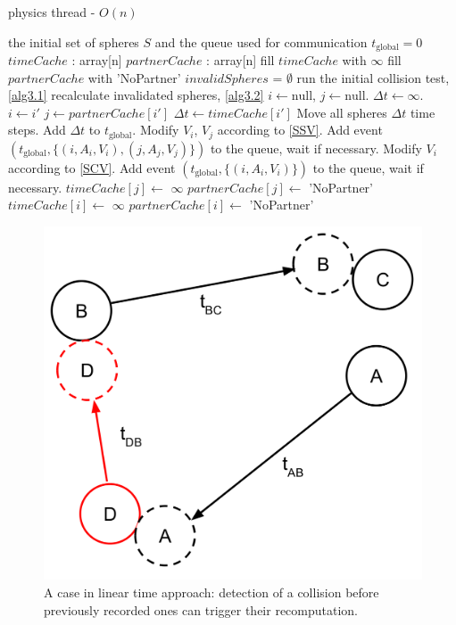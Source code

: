 \documentclass[journal, letterpaper]{IEEEtran}
\begin{document}
\begin{algorithm}
\caption{physics thread - $O(n)$}
\label{alg3}
\begin{algorithmic}
	\REQUIRE the initial set of spheres $S$ and the queue used for communication
	\STATE $t_\text{global}=0$ 
	\STATE $timeCache$ : array[n]
	\STATE $partnerCache$ : array[n]
	\STATE fill $timeCache$ with $\infty$
	\STATE fill $partnerCache$ with 'NoPartner'
	\STATE $invalidSpheres$ = $\emptyset$ 
	\STATE run the initial collision test, \ref{alg3.1}
		\STATE recalculate invalidated spheres, \ref{alg3.2}
		\STATE $i \leftarrow \text{null}$, $j \leftarrow \text{null}$.
		\STATE $\Delta t \leftarrow  \infty$.
				\STATE $i \leftarrow i'$
				\STATE $j \leftarrow partnerCache[i']$
				\STATE $\Delta t \leftarrow timeCache[i']$
			\ENDIF
		\ENDFOR
		\STATE Move all spheres $\Delta t$ time steps.
		\STATE Add $\Delta t$ to $t_\text{global}$.
			\STATE Modify $V_i$, $V_j$ according to \ref{SSV}.
			\STATE Add event $(t_\text{global}, \{(i, A_i, V_i), (j, A_j, V_j)\})$ to the queue, wait if necessary.
			\STATE Modify $V_i$ according to \ref{SCV}.
			\STATE Add event $(t_\text{global}, \{(i, A_i, V_i)\})$ to the queue, wait if necessary.
			\STATE $timeCache[j] \leftarrow$ $\infty$
			\STATE $partnerCache[j] \leftarrow$ 'NoPartner'
		\ENDIF
		\STATE $timeCache[i] \leftarrow$ $\infty$
		\STATE $partnerCache[i] \leftarrow$ 'NoPartner'
	\ENDLOOP
\end{algorithmic}
\end{algorithm}

\begin{figure}[ht!] 
  \centering
  \includegraphics[width=0.7\linewidth]{invalidatePartners.png}
  \caption{A case in linear time approach: detection of a collision before previously recorded ones can trigger their recomputation.}
  \label{fig:invalidate}
\end{figure}
\end{document}
